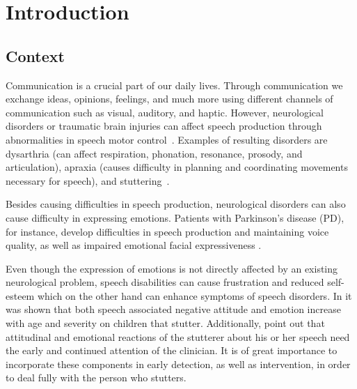 \newcommand{\unlthesis}{\emph{unlthesis}}
\newcommand{\unlthesisclass}{\texttt{unlthesis.cls}}


\chapter{Introduction}
\label{cha:introduction}

\section{Context}


Communication is a crucial part of our daily lives. Through communication we exchange ideas, opinions, feelings, and much more using different channels of communication such as visual, auditory, and haptic. However, neurological disorders or traumatic brain injuries can affect speech production through abnormalities in speech motor control~\cite{communicationDifficulties}. Examples of resulting disorders are \gls{dysarthria} (can affect respiration, phonation, resonance, prosody, and articulation), \gls{apraxia} (causes difficulty in planning and coordinating movements necessary for speech), and \gls{stuttering}~\cite{SLPathologies}.   

Besides causing difficulties in speech production, neurological disorders can also cause difficulty in expressing emotions. Patients with Parkinson's disease (PD), for instance, develop difficulties in speech production and maintaining voice quality, as well as impaired emotional facial expressiveness \cite{Ricciardi2015}.

Even though the expression of emotions is not directly affected by an existing neurological problem, speech disabilities can cause frustration and reduced self-esteem which on the other hand can enhance symptoms of speech disorders. In \cite{Vanryckeghem2001} it was shown that both speech associated negative attitude and emotion increase with age and severity on children that stutter. Additionally, \cite{Vanryckeghem2001} point out that attitudinal and emotional reactions of the stutterer about his or her speech need the early and continued attention of the clinician. It is of great importance to incorporate these components in early detection, as well as intervention, in order to deal fully with the person who stutters.

